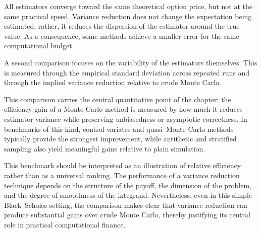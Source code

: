 All estimators converge toward the same theoretical option price, but not at the same practical speed. Variance reduction does not change the expectation being estimated; rather, it reduces the dispersion of the estimator around the true value. As a consequence, some methods achieve a smaller error for the same computational budget.

A second comparison focuses on the variability of the estimators themselves. This is measured through the empirical standard deviation across repeated runs and through the implied variance reduction relative to crude Monte Carlo.



This comparison carries the central quantitative point of the chapter: the efficiency gain of a Monte Carlo method is measured by how much it reduces estimator variance while preserving unbiasedness or asymptotic correctness. In benchmarks of this kind, control variates and quasi--Monte Carlo methods typically provide the strongest improvement, while antithetic and stratified sampling also yield meaningful gains relative to plain simulation.



\begin{remark}
This benchmark should be interpreted as an illustration of relative efficiency rather than as a universal ranking. The performance of a variance reduction technique depends on the structure of the payoff, the dimension of the problem, and the degree of smoothness of the integrand. Nevertheless, even in this simple Black--Scholes setting, the comparison makes clear that variance reduction can produce substantial gains over crude Monte Carlo, thereby justifying its central role in practical computational finance.
\end{remark}
